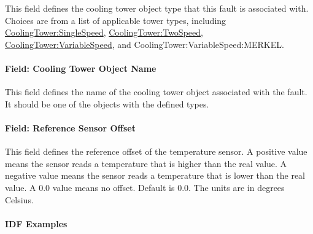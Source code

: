 This field defines the cooling tower object type that this fault is associated with. Choices are from a list of applicable tower types, including \hyperref[coolingtowersinglespeed]{CoolingTower:SingleSpeed}, \hyperref[coolingtowertwospeed]{CoolingTower:TwoSpeed}, \hyperref[coolingtowervariablespeed]{CoolingTower:VariableSpeed}, and CoolingTower:VariableSpeed:MERKEL.

\paragraph{Field: Cooling Tower Object Name}\label{field-tower-object-name}

This field defines the name of the cooling tower object associated with the fault. It should be one of the objects with the defined types.

\paragraph{Field: Reference Sensor Offset}\label{field-reference-sensor-offset}

This field defines the reference offset of the temperature sensor. A positive value means the sensor reads a temperature that is higher than the real value. A negative value means the sensor reads a temperature that is lower than the real value. A 0.0 value means no offset. Default is 0.0. The units are in degrees Celsius.

\paragraph{IDF Examples}

